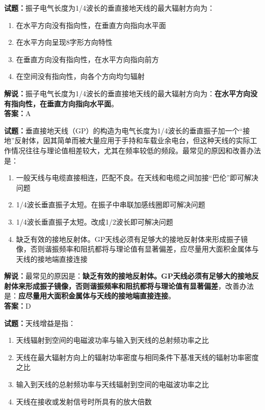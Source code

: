 \documentclass{ctexbook}
\begin{document}
\vspace{\baselineskip}

\noindent\textbf{试题：}振子电气长度为1/4波长的垂直接地天线的最大辐射方向为：

\begin{enumerate}[leftmargin=3em]
  \item 在水平方向没有指向性，在垂直方向指向水平面
  \item 在水平方向呈现8字形方向特性
  \item 在垂直方向没有指向性，在水平方向指向前方
  \item 在空间没有指向性，向各个方向均匀辐射
\end{enumerate}

\noindent\textbf{解说：}振子电气长度为1/4波长的垂直接地天线的最大辐射方向为：\textbf{在水平方向没有指向性，在垂直方向指向水平面}。\\\noindent\textbf{答案：}A%

\vspace{\baselineskip}

\noindent\textbf{试题：}垂直接地天线（GP）的构造为电气长度为1/4波长的垂直振子加一个“接地”反射体，因其简单而被大量应用于手持和车载业余电台，但这种天线的实际工作情况往往与理论值相差较大，尤其在频率较低的频段。最常见的原因和改善办法是：

\begin{enumerate}[leftmargin=3em]
  \item 一般天线与电缆直接相连，匹配不良。在天线和电缆之间加接“巴伦”即可解决问题%
  \item 1/4波长垂直振子太短。在振子中串联加感线圈即可解决问题
  \item 1/4波长垂直振子太短。改成1/2波长即可解决问题
  \item 缺乏有效的接地反射体。GP天线必须有足够大的接地反射体来形成振子镜像，否则谐振频率和阻抗都将与理论值有显著偏差，应尽量用大面积金属体与天线的接地端直接连接
\end{enumerate}

\noindent\textbf{解说：}最常见的原因是：\textbf{缺乏有效的接地反射体。GP天线必须有足够大的接地反射体来形成振子镜像，否则谐振频率和阻抗都将与理论值有显著偏差}，改善办法是：\textbf{应尽量用大面积金属体与天线的接地端直接连接}。\\\noindent\textbf{答案：}D

\vspace{\baselineskip}

\noindent\textbf{试题：}天线增益是指：

\begin{enumerate}[leftmargin=3em]
  \item 天线辐射到空间的电磁波功率与输入到天线的总射频功率之比
  \item 天线在最大辐射方向上的辐射功率密度与相同条件下基准天线的辐射功率密度之比
  \item 输入到天线的总射频功率与天线辐射到空间的电磁波功率之比
  \item 天线在接收或发射信号时所具有的放大倍数
\end{enumerate}
\end{document}
